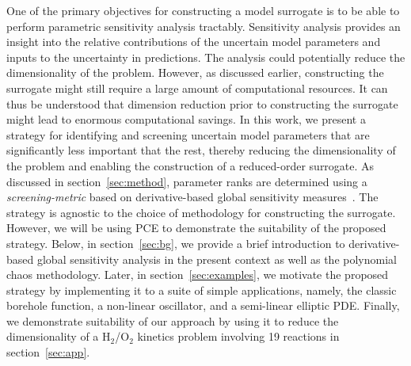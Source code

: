 One of the primary objectives for constructing a model surrogate is to be able to perform 
parametric sensitivity analysis tractably. Sensitivity analysis provides an insight into the
relative contributions of the uncertain model parameters and inputs to the uncertainty in
predictions. The analysis could potentially reduce the dimensionality of the problem.
However, as discussed earlier, constructing the surrogate might still require a large amount
of computational resources. It can thus be understood that dimension reduction prior to
constructing the surrogate might lead to enormous computational savings. In this work,
we present a strategy for identifying and screening uncertain model parameters that 
are significantly less important that the rest, thereby reducing the dimensionality of the
problem and enabling the construction of a reduced-order surrogate. As discussed in
section~\ref{sec:method}, parameter ranks are determined using a \textit{screening-metric}
based on derivative-based global sensitivity 
measures~\cite{Sobol:2009,Sobol:2010,Lamboni:2013,Kucherenko:2009,Kucherenko:2016}. 
The strategy is agnostic to the choice of methodology for constructing the surrogate. However, 
we will be using PCE to demonstrate the suitability of the proposed strategy. Below, in 
section~\ref{sec:bg}, we provide a brief introduction to derivative-based global sensitivity analysis
in the present context as well as the polynomial chaos methodology. Later, in section~\ref{sec:examples},
we motivate the proposed strategy by implementing it to a suite of simple applications, namely, the 
classic borehole function, a non-linear oscillator, and a semi-linear elliptic PDE. Finally, we demonstrate
suitability of our approach by using it to reduce the dimensionality of a H$_2$/O$_2$ kinetics problem
involving 19 reactions in section~\ref{sec:app}. 





